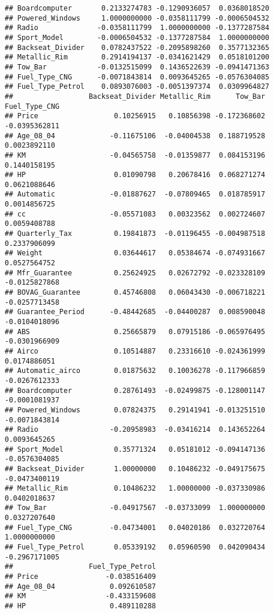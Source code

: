 \documentclass[]{article}
\begin{document}
\begin{verbatim}
## Boardcomputer       0.2133274783 -0.1290936057  0.0368018520
## Powered_Windows     1.0000000000 -0.0358111799 -0.0006504532
## Radio              -0.0358111799  1.0000000000 -0.1377287584
## Sport_Model        -0.0006504532 -0.1377287584  1.0000000000
## Backseat_Divider    0.0782437522 -0.2095898260  0.3577132365
## Metallic_Rim        0.2914194137 -0.0341621429  0.0518101200
## Tow_Bar            -0.0132515099  0.1436522639 -0.0941471363
## Fuel_Type_CNG      -0.0071843814  0.0093645265 -0.0576304085
## Fuel_Type_Petrol    0.0893076003 -0.0051397374  0.0309964827
##                  Backseat_Divider Metallic_Rim      Tow_Bar Fuel_Type_CNG
## Price                  0.10256915   0.10856398 -0.172368602 -0.0395362811
## Age_08_04             -0.11675106  -0.04004538  0.188719528  0.0023892110
## KM                    -0.04565758  -0.01359877  0.084153196  0.1440158195
## HP                     0.01090798   0.20678416  0.068271274  0.0621088646
## Automatic             -0.01887627  -0.07809465  0.018785917  0.0014856725
## cc                    -0.05571083   0.00323562  0.002724607  0.0059408788
## Quarterly_Tax          0.19841873  -0.01196455 -0.004987518  0.2337906099
## Weight                 0.03644617   0.05384674 -0.074931667  0.0527564752
## Mfr_Guarantee          0.25624925   0.02672792 -0.023328109 -0.0125827868
## BOVAG_Guarantee        0.45746808   0.06043430 -0.006718221 -0.0257713458
## Guarantee_Period      -0.48442685  -0.04400287  0.008590048 -0.0104018096
## ABS                    0.25665879   0.07915186 -0.065976495 -0.0301966909
## Airco                  0.10514887   0.23316610 -0.024361999  0.0174886051
## Automatic_airco        0.01875632   0.10036278 -0.117966859 -0.0267612333
## Boardcomputer          0.28761493  -0.02499875 -0.128001147 -0.0001081937
## Powered_Windows        0.07824375   0.29141941 -0.013251510 -0.0071843814
## Radio                 -0.20958983  -0.03416214  0.143652264  0.0093645265
## Sport_Model            0.35771324   0.05181012 -0.094147136 -0.0576304085
## Backseat_Divider       1.00000000   0.10486232 -0.049175675 -0.0473400119
## Metallic_Rim           0.10486232   1.00000000 -0.037330986  0.0402018637
## Tow_Bar               -0.04917567  -0.03733099  1.000000000  0.0327207640
## Fuel_Type_CNG         -0.04734001   0.04020186  0.032720764  1.0000000000
## Fuel_Type_Petrol       0.05339192   0.05960590  0.042090434 -0.2967171005
##                  Fuel_Type_Petrol
## Price                -0.038516409
## Age_08_04             0.092610587
## KM                   -0.433159608
## HP                    0.489110288

\end{verbatim}
\end{document}
